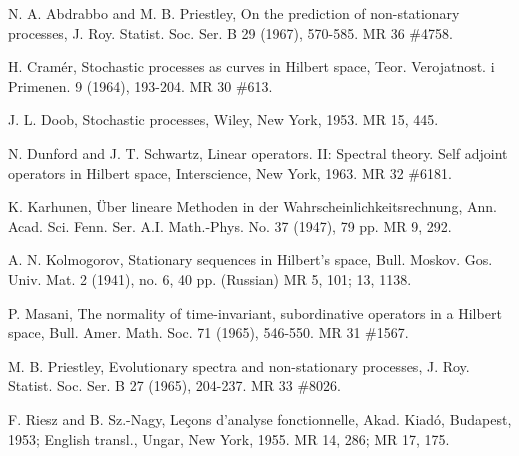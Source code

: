 \documentclass{article}
\begin{document}
\begin{thebibliography}{9}

 N. A. Abdrabbo and M. B. Priestley, On the prediction of non-stationary processes, J. Roy. Statist. Soc. Ser. B 29 (1967), 570-585. MR 36 \#4758.

 H. Cramér, Stochastic processes as curves in Hilbert space, Teor. Verojatnost. i Primenen. 9 (1964), 193-204. MR 30 \#613.

 J. L. Doob, Stochastic processes, Wiley, New York, 1953. MR 15, 445.

 N. Dunford and J. T. Schwartz, Linear operators. II: Spectral theory. Self adjoint operators in Hilbert space, Interscience, New York, 1963. MR 32 \#6181.

 K. Karhunen, Über lineare Methoden in der Wahrscheinlichkeitsrechnung, Ann. Acad. Sci. Fenn. Ser. A.I. Math.-Phys. No. 37 (1947), 79 pp. MR 9, 292.

 A. N. Kolmogorov, Stationary sequences in Hilbert's space, Bull. Moskov. Gos. Univ. Mat. 2 (1941), no. 6, 40 pp. (Russian) MR 5, 101; 13, 1138.

 P. Masani, The normality of time-invariant, subordinative operators in a Hilbert space, Bull. Amer. Math. Soc. 71 (1965), 546-550. MR 31 \#1567.

 M. B. Priestley, Evolutionary spectra and non-stationary processes, J. Roy. Statist. Soc. Ser. B 27 (1965), 204-237. MR 33 \#8026.

 F. Riesz and B. Sz.-Nagy, Leçons d'analyse fonctionnelle, Akad. Kiadó, Budapest, 1953; English transl., Ungar, New York, 1955. MR 14, 286; MR 17, 175.

\end{thebibliography}
\end{document}
